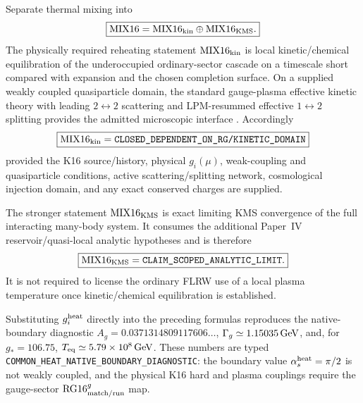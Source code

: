 \documentclass[12pt,a4paper]{article}
\begin{document}
\begin{theorem}
\label{p9:thm:v181-mix16-factorization}
Separate thermal mixing into
\[
 \boxed{\mathrm{MIX16}=\mathrm{MIX16}_{\rm kin}
 \oplus\mathrm{MIX16}_{\rm KMS}.}
\]
The physically required reheating statement \(\mathrm{MIX16}_{\rm kin}\) is
local kinetic/chemical equilibration of the underoccupied ordinary-sector
cascade on a timescale short compared with expansion and the chosen completion
surface.  On a supplied weakly coupled quasiparticle domain, the standard
gauge-plasma effective kinetic theory with leading \(2\leftrightarrow2\)
scattering and LPM-resummed effective \(1\leftrightarrow2\) splitting provides
the admitted microscopic interface
\cite{AMY2003EKT,KurkelaMoore2011Thermalization,HarigayaMukaida2014Reheating,DreesNajjari2022Cascade,MukaidaYamada2022SMCascade,MukaidaYamada2024YMReheating}.
Accordingly
\[
 \boxed{\mathrm{MIX16}_{\rm kin}
 =\texttt{CLOSED\_DEPENDENT\_ON\_RG/KINETIC\_DOMAIN}}
\]
provided the K16 source/history, physical \(g_i(\mu)\), weak-coupling and
quasiparticle conditions, active scattering/splitting network, cosmological
injection domain, and any exact conserved charges are supplied.

The stronger statement \(\mathrm{MIX16}_{\rm KMS}\) is exact limiting KMS
convergence of the full interacting many-body system.  It consumes the
additional Paper~IV reservoir/quasi-local analytic hypotheses and is therefore
\[
 \boxed{\mathrm{MIX16}_{\rm KMS}=\texttt{CLAIM\_SCOPED\_ANALYTIC\_LIMIT}.}
\]
It is not required to license the ordinary FLRW use of a local plasma
temperature once kinetic/chemical equilibration is established.
\end{theorem}

\begin{remark}
\label{p9:rem:v181-commonheat-rate-firewall}
Substituting \(g_i^{\rm heat}\) directly into the preceding formulas reproduces
the native-boundary diagnostic
\(A_g=0.0371314809117606\ldots\),
\(\Gamma_g\simeq1.15035\,{\rm GeV}\), and, for \(g_*=106.75\),
\(T_{\rm eq}\simeq5.79\times10^8\,{\rm GeV}\).  These numbers are typed
\texttt{COMMON\_HEAT\_NATIVE\_BOUNDARY\_DIAGNOSTIC}: the boundary value
\(\alpha_s^{\rm heat}=\pi/2\) is not weakly coupled, and the physical K16 hard
and plasma couplings require the gauge-sector $\mathrm{RG16}^{g}_{\rm match/run}$ map.
\end{remark}
\end{document}
